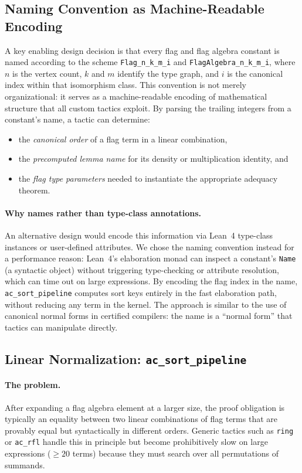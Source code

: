 \documentclass{article}
\newcommand{\lean}[1]{\texttt{#1}}
\begin{document}
\subsection{Naming Convention as Machine-Readable Encoding}

A key enabling design decision is that every flag and flag algebra constant is
named according to the scheme \lean{Flag\_n\_k\_m\_i} and
\lean{FlagAlgebra\_n\_k\_m\_i}, where $n$ is the vertex count, $k$ and $m$
identify the type graph, and $i$ is the canonical index within that
isomorphism class.  This convention is not merely organizational: it serves as
a machine-readable encoding of mathematical structure that all custom tactics
exploit.  By parsing the trailing integers from a constant's name, a tactic can
determine:
\begin{itemize}
  \item the \emph{canonical order} of a flag term in a linear combination,
  \item the \emph{precomputed lemma name} for its density or multiplication
    identity, and
  \item the \emph{flag type parameters} needed to instantiate the appropriate
    adequacy theorem.
\end{itemize}

\paragraph{Why names rather than type-class annotations.}
An alternative design would encode this information via Lean~4 type-class
instances or user-defined attributes.  We chose the naming convention instead
for a performance reason: Lean~4's elaboration monad can inspect a constant's
\lean{Name} (a syntactic object) without triggering type-checking or
attribute resolution, which can time out on large expressions.  By encoding
the flag index in the name, \lean{ac\_sort\_pipeline} computes sort keys
entirely in the fast elaboration path, without reducing any term in the kernel.
The approach is similar to the use of canonical normal forms in certified
compilers: the name is a ``normal form'' that tactics can manipulate directly.

\subsection{Linear Normalization: \lean{ac\_sort\_pipeline}}

\paragraph{The problem.}
After expanding a flag algebra element at a larger size, the proof obligation
is typically an equality between two linear combinations of flag terms that are
provably equal but syntactically in different orders.  Generic tactics such as
\lean{ring} or \lean{ac\_rfl} handle this in principle but become prohibitively
slow on large expressions ($\geq 20$ terms) because they must search over all
permutations of summands.
\end{document}
